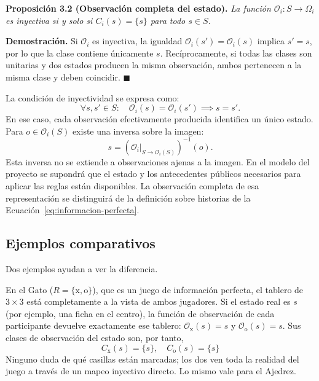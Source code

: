 \noindent\textbf{Proposición 3.2 (Observación completa del estado).} \textit{La función $\mathcal O_i:S\to\Omega_i$ es inyectiva si y solo si $C_i(s)=\{s\}$ para todo $s\in S$.}

\noindent\textbf{Demostración.} Si $\mathcal O_i$ es inyectiva, la igualdad $\mathcal O_i(s')=\mathcal O_i(s)$ implica $s'=s$, por lo que la clase contiene únicamente $s$. Recíprocamente, si todas las clases son unitarias y dos estados producen la misma observación, ambos pertenecen a la misma clase y deben coincidir. \hfill $\blacksquare$

La condición de inyectividad se expresa como:
\begin{equation}
    \forall s,s'\in S:\quad\mathcal O_i(s)=\mathcal O_i(s')\implies s=s'.
    \label{eq:inyectividad-observacion}
\end{equation}
En ese caso, cada observación efectivamente producida identifica un único estado. Para $o\in\mathcal O_i(S)$ existe una inversa sobre la imagen:
\begin{equation}
    s=\left(\mathcal O_i\big|_{S\to\mathcal O_i(S)}\right)^{-1}(o).
    \label{eq:reconstruccion-estado}
\end{equation}
Esta inversa no se extiende a observaciones ajenas a la imagen. En el modelo del proyecto se supondrá que el estado y los antecedentes públicos necesarios para aplicar las reglas están disponibles. La observación completa de esa representación se distinguirá de la definición sobre historias de la Ecuación~\eqref{eq:informacion-perfecta}.

\subsection{Ejemplos comparativos}

Dos ejemplos ayudan a ver la diferencia.

En el Gato ($R = \{\text{x}, \text{o}\}$), que es un juego de información perfecta, el tablero de $3 \times 3$ está completamente a la vista de ambos jugadores. Si el estado real es $s$ (por ejemplo, una ficha en el centro), la función de observación de cada participante devuelve exactamente ese tablero: $\mathcal{O}_{\text{x}}(s) = s$ y $\mathcal{O}_{\text{o}}(s) = s$. Sus clases de observación del estado son, por tanto,
\begin{equation}
    C_{\text{x}}(s) = \{s\}, \quad C_{\text{o}}(s) = \{s\}
    \label{eq:gato-informacion-perfecta}
\end{equation}
Ninguno duda de qué casillas están marcadas; los dos ven toda la realidad del juego a través de un mapeo inyectivo directo. Lo mismo vale para el Ajedrez.

